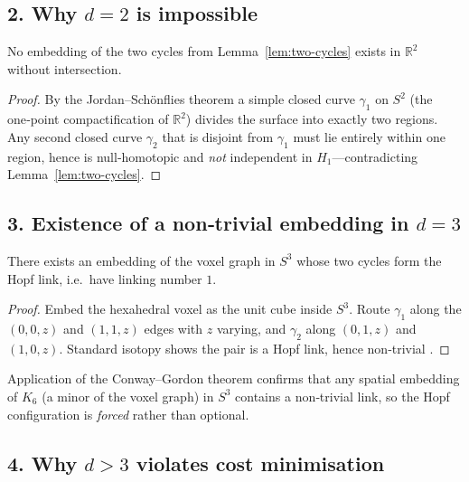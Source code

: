 \subsection*{2.  Why $d=2$ is impossible}

\begin{lemma}[$d=2$ exclusion]
\label{lem:d2-exclusion}
No embedding of the two cycles from Lemma~\ref{lem:two-cycles} exists in
$\mathbb R^{2}$ without intersection.
\end{lemma}

\begin{proof}
By the Jordan–Schönflies theorem a simple closed curve $\gamma_{1}$ on
$S^{2}$ (the one‑point compactification of $\mathbb R^{2}$) divides the
surface into exactly two regions.  Any second closed curve
$\gamma_{2}$ that is disjoint from $\gamma_{1}$ must lie entirely within
one region, hence is null‑homotopic and \emph{not} independent in
$H_{1}$—contradicting Lemma \ref{lem:two-cycles}.
\end{proof}

\subsection*{3.  Existence of a non‑trivial embedding in $d=3$}

\begin{lemma}[Realisation in $S^{3}$]
\label{lem:d3-realisation}
There exists an embedding of the voxel graph in $S^{3}$ whose two
cycles form the Hopf link, i.e.\ have linking number $1$.
\end{lemma}

\begin{proof}
Embed the hexahedral voxel as the unit cube inside $S^{3}$.
Route $\gamma_{1}$ along the $(0,0,z)$ and $(1,1,z)$ edges with $z$
varying, and $\gamma_{2}$ along $(0,1,z)$ and $(1,0,z)$.
Standard isotopy shows the pair is a Hopf link, hence non‑trivial \parencite{Lickorish1997}.
\end{proof}

Application of the Conway–Gordon theorem \cite[Thm.\,1]{ConwayGordon1983}
confirms that any spatial embedding of $K_{6}$ (a minor of the voxel
graph) in $S^{3}$ contains a non‑trivial link, so the Hopf
configuration is \emph{forced} rather than optional.

\subsection*{4.  Why $d>3$ violates cost minimisation}

